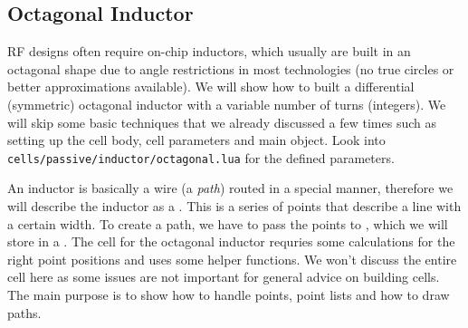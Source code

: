 \subsection{Octagonal Inductor}
RF designs often require on-chip inductors, which usually are built in an octagonal shape due to angle restrictions in most technologies (no true circles or
better approximations available).
We will show how to built a differential (symmetric) octagonal inductor with a variable number of turns (integers).
We will skip some basic techniques that we already discussed a few times such as setting up the cell body, cell parameters and main object.
Look into \texttt{cells/passive/inductor/octagonal.lua} for the defined parameters.

An inductor is basically a wire (a \emph{path}) routed in a special manner, therefore we will describe the inductor as a .
This is a series of points that describe a line with a certain width.
To create a path, we have to pass the points to , which we will store in a .
The cell for the octagonal inductor requries some calculations for the right point positions and uses some helper functions.
We won't discuss the entire cell here as some issues are not important for general advice on building cells.
The main purpose is to show how to handle points, point lists and how to draw paths.

